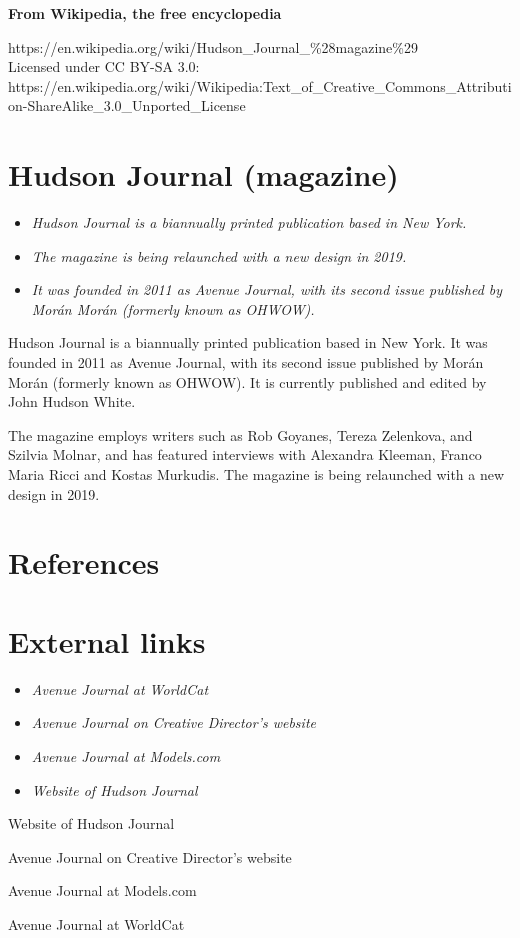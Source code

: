 \textbf{From Wikipedia, the free encyclopedia}

https://en.wikipedia.org/wiki/Hudson\_Journal\_\%28magazine\%29\\
Licensed under CC BY-SA 3.0:\\
https://en.wikipedia.org/wiki/Wikipedia:Text\_of\_Creative\_Commons\_Attribution-ShareAlike\_3.0\_Unported\_License

\section{Hudson Journal (magazine)}\label{hudson-journal-magazine}

\begin{itemize}
\item
  \emph{Hudson Journal is a biannually printed publication based in New
  York.}
\item
  \emph{The magazine is being relaunched with a new design in 2019.}
\item
  \emph{It was founded in 2011 as Avenue Journal, with its second issue
  published by Morán Morán (formerly known as OHWOW).}
\end{itemize}

Hudson Journal is a biannually printed publication based in New York. It
was founded in 2011 as Avenue Journal, with its second issue published
by Morán Morán (formerly known as OHWOW). It is currently published and
edited by John Hudson White.

The magazine employs writers such as Rob Goyanes, Tereza Zelenkova, and
Szilvia Molnar, and has featured interviews with Alexandra Kleeman,
Franco Maria Ricci and Kostas Murkudis. The magazine is being relaunched
with a new design in 2019.

\section{References}\label{references}

\section{External links}\label{external-links}

\begin{itemize}
\item
  \emph{Avenue Journal at WorldCat}
\item
  \emph{Avenue Journal on Creative Director's website}
\item
  \emph{Avenue Journal at Models.com}
\item
  \emph{Website of Hudson Journal}
\end{itemize}

Website of Hudson Journal

Avenue Journal on Creative Director's website

Avenue Journal at Models.com

Avenue Journal at WorldCat
